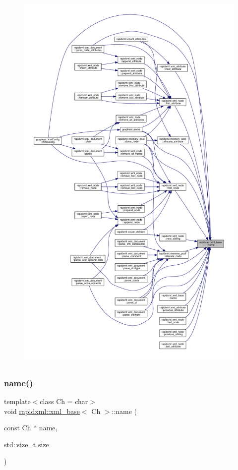 \begin{figure}[H]
\begin{center}
\leavevmode
\includegraphics[height=550pt]{classrapidxml_1_1xml__base_aef8ae147fbee59209f714274afc80dc4_icgraph}
\end{center}
\end{figure}
\mbox{\label{classrapidxml_1_1xml__base_ae55060ae958c6e6465d6c8db852ec6ce}} 
\subsubsection{\texorpdfstring{name()}{name()}\hspace{0.1cm}{\footnotesize\ttfamily [2/3]}}
{\footnotesize\ttfamily template$<$class Ch  = char$>$ \\
void \mbox{\hyperlink{classrapidxml_1_1xml__base}{rapidxml\+::xml\+\_\+base}}$<$ Ch $>$\+::name (\begin{DoxyParamCaption}\item[{const Ch $\ast$}]{name,  }\item[{std\+::size\+\_\+t}]{size }\end{DoxyParamCaption})\hspace{0.3cm}{\ttfamily [inline]}}

